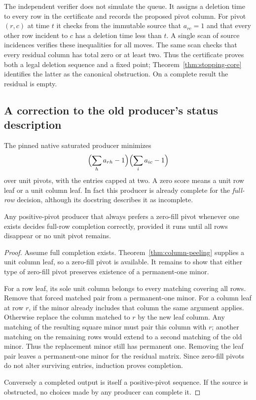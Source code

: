 The independent verifier does not simulate the queue.  It assigns a deletion
time to every row in the certificate and records the proposed pivot column.
For pivot $(r,c)$ at time $t$ it checks from the immutable source that
$a_{rc}=1$ and that every other row incident to $c$ has a deletion time less
than $t$.  A single scan of source incidences verifies these inequalities for
all moves.  The same scan checks that every residual column has total zero
or at least two.  Thus the certificate proves both a legal deletion sequence
and a fixed point; Theorem~\ref{thm:stopping-core} identifies the latter as
the canonical obstruction.  On a complete result the residual is empty.

\subsection{A correction to the old producer's status description}

The pinned native saturated producer minimizes
\[
  \Bigl(\sum_h a_{rh}-1\Bigr)
  \Bigl(\sum_i a_{ic}-1\Bigr)
\]
over unit pivots, with the entries capped at two.  A zero score means a
unit row leaf or a unit column leaf.  In fact this producer is already
complete for the \emph{full-row} decision, although its docstring describes
it as incomplete.

\begin{proposition}
Any positive-pivot producer that always prefers a zero-fill pivot whenever
one exists decides full-row completion correctly, provided it runs until all
rows disappear or no unit pivot remains.
\end{proposition}
\begin{proof}
Assume full completion exists.  Theorem~\ref{thm:column-peeling} supplies a
unit column leaf, so a zero-fill pivot is available.  It remains to show that
either type of zero-fill pivot preserves existence of a permanent-one minor.

For a row leaf, its sole unit column belongs to every matching covering all
rows.  Remove that forced matched pair from a permanent-one minor.  For a
column leaf at row $r$, if the minor already includes that column the same
argument applies.  Otherwise replace the column matched to $r$ by the new
leaf column.  Any matching of the resulting square minor must pair this
column with $r$; another matching on the remaining rows would extend to a
second matching of the old minor.  Thus the replacement minor still has
permanent one.  Removing the leaf pair leaves a permanent-one minor for the
residual matrix.  Since zero-fill pivots do not alter surviving entries,
induction proves completion.

Conversely a completed output is itself a positive-pivot sequence.  If the
source is obstructed, no choices made by any producer can complete it.
\end{proof}

